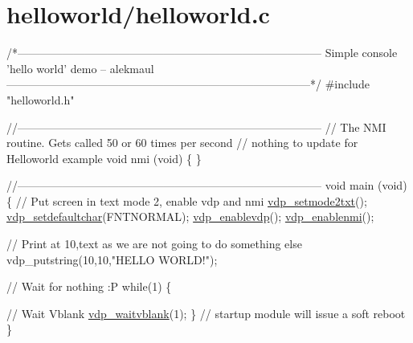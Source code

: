 \hypertarget{a00060}{}\section{helloworld/helloworld.\+c}

\begin{DoxyCodeInclude}
\textcolor{comment}{/*---------------------------------------------------------------------------------}
\textcolor{comment}{}
\textcolor{comment}{}
\textcolor{comment}{    Simple console 'hello world' demo}
\textcolor{comment}{    -- alekmaul}
\textcolor{comment}{}
\textcolor{comment}{}
\textcolor{comment}{---------------------------------------------------------------------------------*/}
\textcolor{preprocessor}{#include "helloworld.h"}

\textcolor{comment}{//---------------------------------------------------------------------------------}
\textcolor{comment}{// The NMI routine. Gets called 50 or 60 times per second }
\textcolor{comment}{// nothing to update for Helloworld example}
\textcolor{keywordtype}{void} nmi (\textcolor{keywordtype}{void}) \{
\}

\textcolor{comment}{//---------------------------------------------------------------------------------}
\textcolor{keywordtype}{void} main (\textcolor{keywordtype}{void}) \{
    \textcolor{comment}{// Put screen in text mode 2, enable vdp and nmi}
    \hyperlink{a00053_a82f80697be61ae9fc4651379b907190a}{vdp\_setmode2txt}();
    \hyperlink{a00053_a56edf716a6be2b5850249d24861fc845}{vdp\_setdefaultchar}(FNTNORMAL);
    \hyperlink{a00053_a79f55e5785e18e189852d14a78f7da64}{vdp\_enablevdp}(); 
    \hyperlink{a00053_acfc547ddc2c924a276f1ee0351751102}{vdp\_enablenmi}();
    
    \textcolor{comment}{// Print at 10,text as we are not going to do something else}
    vdp\_putstring(10,10,\textcolor{stringliteral}{"HELLO WORLD!"});
    
    \textcolor{comment}{// Wait for nothing :P}
    \textcolor{keywordflow}{while}(1) \{
    
        \textcolor{comment}{// Wait Vblank}
        \hyperlink{a00053_a83dfd82e385330c883c67c30137f9857}{vdp\_waitvblank}(1);
    \}
    \textcolor{comment}{// startup module will issue a soft reboot }
\}
\end{DoxyCodeInclude}
 